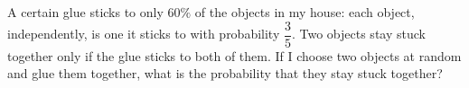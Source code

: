 A certain glue sticks to only $60\%$ of the objects in my house: each object, independently, is one it sticks to with probability $\dfrac35$. Two objects stay stuck together only if the glue sticks to both of them. If I choose two objects at random and glue them together, what is the probability that they stay stuck together?
